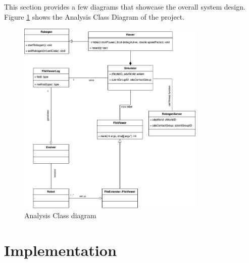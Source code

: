 \documentclass[11pt,a4paper]{article}
\begin{document}
This section provides a few diagrams that showcase the overall system design.
Figure \ref{fig:analysis-class-diagram} shows the Analysis Class Diagram of the
project.

\begin{figure}[htpb]
    \centering
    \includegraphics[width=0.8\textwidth]{1}
    \caption{Analysis Class diagram}
    \label{fig:analysis-class-diagram}
\end{figure}

\section{Implementation}

\end{document}
